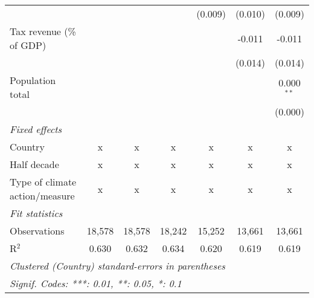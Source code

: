 \begin{tabular}{lcccccc}
                                                    &                &                &                & (0.009)        & (0.010)        & (0.009)\\   
   Tax revenue (\% of GDP)                          &                &                &                &                & -0.011         & -0.011\\   
                                                    &                &                &                &                & (0.014)        & (0.014)\\   
   Population total                                 &                &                &                &                &                & 0.000$^{**}$\\   
                                                    &                &                &                &                &                & (0.000)\\   
   \emph{Fixed effects}\\
   Country                                          & x              & x              & x              & x              & x              & x\\  
   Half decade                                      & x              & x              & x              & x              & x              & x\\  
   Type of climate action/measure                   & x              & x              & x              & x              & x              & x\\  
   \midrule \emph{Fit statistics}\\
   Observations                                     & 18,578         & 18,578         & 18,242         & 15,252         & 13,661         & 13,661\\  
   R$^2$                                            & 0.630          & 0.632          & 0.634          & 0.620          & 0.619          & 0.619\\  
   \midrule
   \multicolumn{7}{l}{\emph{Clustered (Country) standard-errors in parentheses}}\\
   \multicolumn{7}{l}{\emph{Signif. Codes: ***: 0.01, **: 0.05, *: 0.1}}\\
\end{tabular}
\par\endgroup


